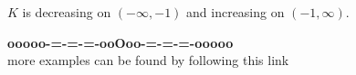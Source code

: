 \documentclass{ximera}
\begin{document}
$K$ is decreasing on $(-\infty, -1)$ and increasing on $(-1, \infty)$.









\begin{onlineOnly}
\begin{center}
\textbf{\textcolor{green!50!black}{ooooo-=-=-=-ooOoo-=-=-=-ooooo}} \\

more examples can be found by following this link\\ 

\end{center}
\end{onlineOnly}
\end{document}
